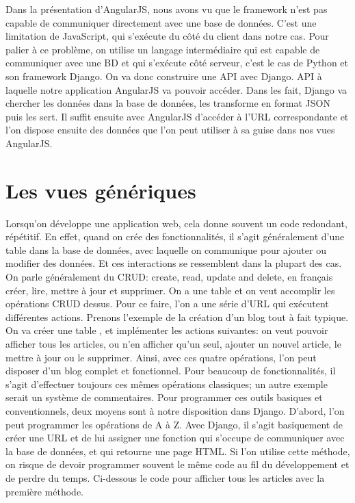\documentclass[a4paper,10pt,twoside]{sphinxmanual}
\begin{document}
Dans la présentation d'AngularJS, nous avons vu que le framework n'est pas capable de communiquer directement avec une base de données. C'est une limitation de JavaScript, qui s'exécute du côté du client dans notre cas. Pour palier à ce problème, on utilise un langage intermédiaire qui est capable de communiquer avec une BD et qui s'exécute côté serveur, c'est le cas de Python et son framework Django. On va donc construire une API avec Django. API à laquelle notre application AngularJS va pouvoir accéder. Dans les fait, Django va chercher les données dans la base de données, les transforme en format JSON puis les sert. Il suffit ensuite avec AngularJS d'accéder à l'URL correspondante et l'on dispose ensuite des données que l'on peut utiliser à sa guise dans nos vues AngularJS.


\section{Les vues génériques}
\label{restless:les-vues-generiques}
Lorsqu'on développe une application web, cela donne souvent un code redondant, répétitif. En effet, quand on crée des fonctionnalités, il s'agit généralement d'une table dans la base de données, avec laquelle on communique pour ajouter ou modifier des données. Et ces interactions se ressemblent dans la plupart des cas. On parle généralement du CRUD: create, read, update and delete, en français créer, lire, mettre à jour et supprimer. On a une table et on veut accomplir les opérations CRUD dessus. Pour ce faire, l'on a une série d'URL qui exécutent différentes actions. Prenons l'exemple de la création d'un blog tout à fait typique. On va créer une table , et implémenter les actions suivantes: on veut pouvoir afficher tous les articles, ou n'en afficher qu'un seul, ajouter un nouvel article, le mettre à jour ou le supprimer. Ainsi, avec ces quatre opérations, l'on peut disposer d'un blog complet et fonctionnel. Pour beaucoup de fonctionnalités, il s'agit d'effectuer toujours ces mêmes opérations classiques; un autre exemple serait un système de commentaires. Pour programmer ces outils basiques et conventionnels, deux moyens sont à notre disposition dans Django. D'abord, l'on peut programmer les opérations de A à Z. Avec Django, il s'agit basiquement de créer une URL et de lui assigner une fonction qui s'occupe de communiquer avec la base de données, et qui retourne une page HTML. Si l'on utilise cette méthode, on risque de devoir programmer souvent le même code au fil du développement et de perdre du temps. Ci-dessous le code pour afficher tous les articles avec la première méthode.
\end{document}

